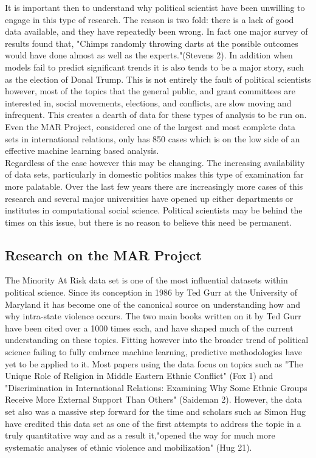 \documentclass[12pt]{article}
\begin{document}
	It is important then to understand why political scientist have been unwilling to engage in this type of research. The reason is two fold: there is a lack of good data available, and they have repeatedly been wrong. In fact one major survey of results found that, {"Chimps randomly throwing darts at the possible outcomes would have done almost as well as the experts."}(Stevens 2). In addition when models fail to predict significant trends it is also tends to be a major story, such as the election of Donal Trump. This is not entirely the fault of political scientists however, most of the topics that the general public, and grant committees are interested in, social movements, elections, and conflicts, are slow moving and infrequent. This creates a dearth of data for these types of analysis to be run on. Even the MAR Project, considered one of the largest and most complete data sets in international relations, only has 850 cases which is on the low side of an effective machine learning based analysis. \\

	Regardless of the case however this may be changing. The increasing availability of data sets, particularly in domestic politics makes this type of examination far more palatable. Over the last few years there are increasingly more cases of this research and several major universities have opened up either departments or institutes in computational social science. Political scientists may be behind the times on this issue, but there is no reason to believe this need be permanent.\\

\subsection{Research on the MAR Project}
	The Minority At Risk data set is one of the most influential datasets within political science. Since its conception in 1986 by Ted Gurr at the University of Maryland it has become one of the canonical source on understanding how and why intra-state violence occurs. The two main books written on it by Ted Gurr have been cited over a 1000 times each, and have shaped much of the current understanding on these topics. Fitting however into the broader trend of political science failing to fully embrace machine learning, predictive methodologies have yet to be applied to it. Most papers using the data focus on topics such as {"The Unique Role of Religion in Middle Eastern Ethnic Conflict" (Fox 1)} and {"Discrimination in International Relations: Examining Why Some Ethnic Groups Receive More External Support Than Others" (Saideman 2)}.  However, the data set also was a massive step forward for the time and scholars such as Simon Hug have credited this data set as one of the first attempts to address the topic in a truly quantitative way and as a result it,{"opened the way for much more systematic analyses of ethnic violence and mobilization" (Hug 21)}. \\
\end{document}
